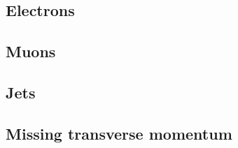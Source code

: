 
\subsection{Electrons}
\subsection{Muons}
\subsection{Jets}
\subsection{Missing transverse momentum}

